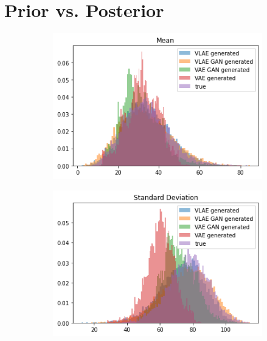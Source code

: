 \documentclass{beamer}
\begin{document}
\section{Prior vs. Posterior}
\begin{frame}
\begin{figure}
\centering
\begin{subfigure}{0.48\textwidth}
\centering
\includegraphics[width=\textwidth]{images/generated_vs_true/mnist/mnist_vs_models_mean.png}
\end{subfigure}
\hfill
\begin{subfigure}{0.48\textwidth}
\centering
\includegraphics[width=\textwidth]{images/generated_vs_true/mnist/mnist_vs_models_sd.png}
\end{subfigure}
\hfill
\begin{subfigure}{0.48\textwidth}

\end{subfigure}
\end{figure}
\end{frame}
\end{document}

